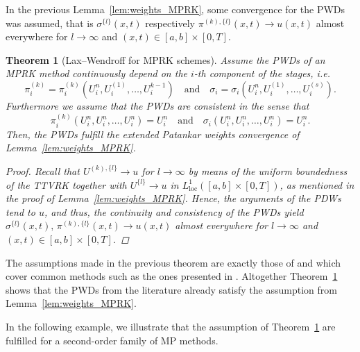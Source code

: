 \documentclass[final,11pt, times, linenumber, nopreprintline]{elsarticle}
\newtheorem{thm}{Theorem}
\begin{document}
In the previous Lemma~\ref{lem:weights_MPRK}, some convergence for the PWDs was assumed, that is $\sigma^{\{l\}}(x,t)$ respectively $\pi^{(k),\{l\}}(x,t) \rightarrow u(x,t)$ almost everywhere for $l \rightarrow \infty$ and $(x,t) \in [a,b]\times [0,T]$.

\begin{thm}[Lax--Wendroff for MPRK schemes]\label{thm:lxw_MPRK}
     Assume the PWDs of an MPRK method continuously depend on the $i$-th component of the stages, i.e.
    $$ \pi_i^{(k)} = \pi_i^{(k)}(U_i^n, U_i^{(1)}, \dots, U_i^{k-1}) \quad \text{and} \quad
    \sigma_i = \sigma_i(U_i^n, U_i^{(1)}, \dots, U_i^{(s)}).
    $$
    Furthermore we assume that the PWDs are consistent in the sense that %
    $$
    \pi_i^{(k)}(U_i^n, U_i^n, \dots, U_i^n) = U_i^n \quad \text{and} \quad 
    \sigma_i(U_i^n, U_i^n, \dots, U_i^n) = U_i^n.
    $$
    Then, the PWDs fulfill the extended Patankar weights convergence of Lemma~\ref{lem:weights_MPRK}.
\begin{proof}
    Recall that $U^{(k),\{l\}} \rightarrow u$ for $l \rightarrow \infty$ by means of the uniform boundedness of the TTVRK together with $U^{\{l\}}\to u$ in $L^1_{\text{loc}}([a,b]\times [0,T] )$, as mentioned in the proof of Lemma~\ref{lem:weights_MPRK}. Hence, the arguments of the PDWs tend to $u$, and thus, the continuity and consistency of the PWDs yield $\sigma^{\{l\}}(x,t),\,\pi^{(k),\{l\}}(x,t) \rightarrow u(x,t)$ almost everywhere for $l \rightarrow \infty$ and $(x,t) \in [a,b]\times [0,T]$.
\end{proof}
\end{thm}

\begin{rmk}
The assumptions made in the previous theorem are exactly those of \cite{IzginThesis} and \cite{avila_extension_2021} which cover common methods such as the ones presented in \cite{kopecz_order_2018,KM18Order3,offner2020arbitrary}.
     Altogether Theorem~\ref{thm:lxw_MPRK} shows that the PWDs from the literature already satisfy the assumption from Lemma~\ref{lem:weights_MPRK}.
\end{rmk}

In the following example, we illustrate that the assumption of Theorem~\ref{thm:lxw_MPRK} are fulfilled for a second-order family  of MP methods.
\end{document}
